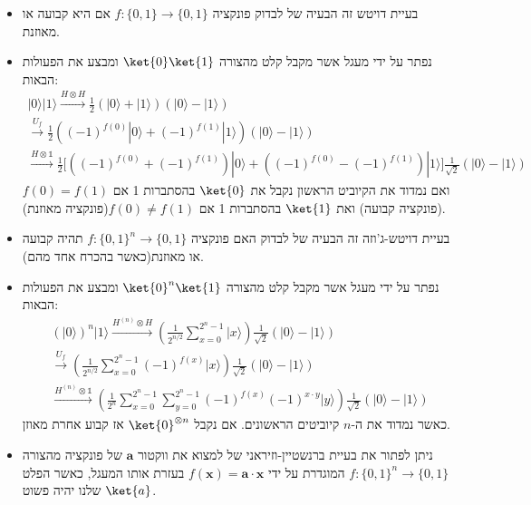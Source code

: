 \documentclass{tstextbook}
\begin{document}
\begin{summary}
  \begin{itemize}
    \item בעיית דויטש זה הבעיה של לבדוק פונקציה \(f:\{ 0,1 \}\to \{ 0,1 \}\) אם היא קבועה או מאוזנת.
    \item נפתר על ידי מעגל אשר מקבל קלט מהצורה \(\ket{0}\ket{1}\) ומבצע את הפעולות הבאות:
$$\begin{gather}|0\rangle|1\rangle\xrightarrow{H\otimes H}\frac{1}{2}(|0\rangle+|1\rangle)(|0\rangle-|1\rangle)\\ \xrightarrow{U_{f}}\frac{1}{2}\left((-1)^{f(0)}|0\rangle+(-1)^{f(1)}|1\rangle\right)\left(|0\rangle-|1\rangle\right)\\ \xrightarrow{H\otimes \mathbb{1} }\frac{1}{2}\Bigg[\left((-1)^{f(0)}+(-1)^{f(1)}\right)|0\rangle+\left((-1)^{f(0)}-(-1)^{f(1)}\right)|1\rangle\Bigg]\frac{1}{\sqrt{2}}(|0\rangle-|1\rangle) 
\end{gather}$$
ואם נמדוד את הקיוביט הראשון נקבל את \(\ket{0}\) בהסתברות 1 אם \(f(0)=f(1)\) (פונקציה קבועה) ואת \(\ket{1}\) בהסתברות 1 אם \(f(0)\neq f(1)\)(פונקציה מאוזנת). 
    \item בעיית דויטש-ג'וזה זה הבעיה של לבדוק האם פונקציה \(f:\{ 0,1 \}^{n}\to \{ 0,1 \}\) תהיה קבועה או מאוזנת(כאשר בהכרח אחד מהם).
    \item נפתר על ידי מעגל אשר מקבל קלט מהצורה \(\ket{0}^{n}\ket{1}\) ומבצע את הפעולות הבאות:
$$\begin{gather}{{\left( |0\rangle \right)^{n}|1\rangle\xrightarrow{H^{(n)}\otimes H}\left(\frac{1}{2^{n/2}}\sum_{x=0}^{2^{n}-1}|x\rangle\right)\frac{1}{\sqrt{2}}\left( |0\rangle-|1\rangle \right)}}\\ {{\xrightarrow{U_{f}}\left(\frac{1}{2^{n/2}}\sum_{x=0}^{2^{n}-1}(-1)^{f(x)}|x\rangle\right)\frac{1}{\sqrt{2}}\left( |0\rangle-|1\rangle \right)}}\\ {{\xrightarrow{H^{(n) }\otimes \mathbb{ 1}}\left(\frac{1}{2^{n}}\sum_{x=0}^{2^{n}-1}\sum_{y=0}^{2^{n}-1}(-1)^{f(x)}(-1)^{x\cdot y}|y\rangle\right)\frac{1}{\sqrt{2}}\left( |0\rangle-|1\rangle \right)}} 
\end{gather}$$
כאשר נמדוד את ה-\(n\) קיוביטים הראשונים. אם נקבל \(\ket{0}^{\otimes n}\) אז קבוע אחרת מאוזן.
    \item ניתן לפתור את בעיית ברנשטיין-וזיראני של למצוא את ווקטור \(\mathbf{a}\) של פונקציה מהצורה \(f:\{ 0,1 \}^{n}\to\{ 0,1 \}\) המוגדרת על ידי \(f\left( \mathbf{x} \right)=\mathbf{a}\cdot \mathbf{x}\) בעזרת אותו המעגל, כאשר הפלט שלנו יהיה פשוט \(\ket{a}\).
  \end{itemize}
\end{summary}
\end{document}
